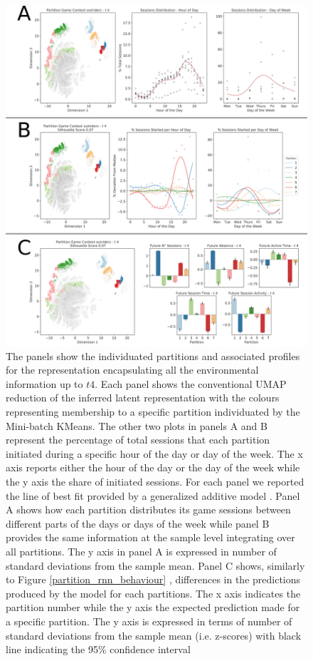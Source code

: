 \begin{figure}[!htb]
\includegraphics[width=\textwidth]{images/chapter_4/clust_env.png}
\centering
\caption[\textbf{Partitions of the representations generated by the RNN architectures using the environmental metrics}]{The panels show the individuated partitions and associated profiles for the representation encapsulating all the environmental information up to $t4$. Each panel shows the conventional UMAP reduction of the inferred latent representation with the colours representing membership to a specific partition individuated by the Mini-batch KMeans. The other two plots in panels A and B represent the percentage of total sessions that each partition initiated during a specific hour of the day or day of the week. The x axis reports either the hour of the day or the day of the week while the y axis the share of initiated sessions. For each panel we reported the line of best fit provided by a generalized additive model \cite{serven2018}. Panel A shows how each partition distributes its game sessions between different parts of the days or days of the week while panel B provides the same information at the sample level integrating over all partitions. The y axis in panel A is expressed in number of standard deviations from the sample mean. Panel C shows, similarly to Figure \ref{partition_rnn_behaviour} , differences in the predictions produced by the model for each partitions. The x axis indicates the partition number while the y axis the expected prediction made for a specific partition. The y axis is expressed in terms of number of standard deviations from the sample mean (i.e. z-scores) with black line indicating the 95\% confidence interval}
\label{partition_rnn_env} 
\end{figure}

